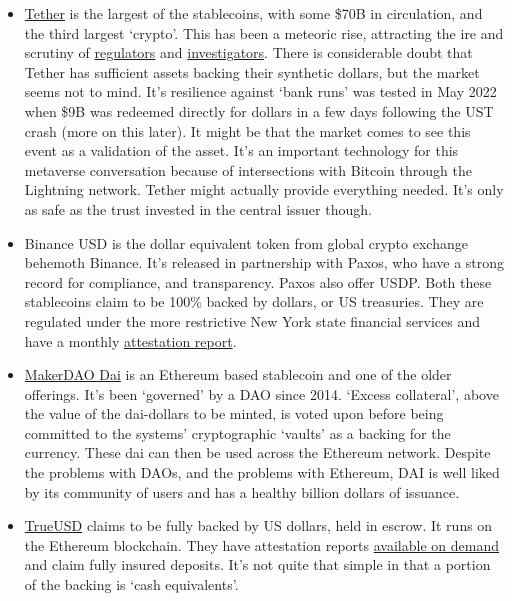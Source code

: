 \begin{itemize}
\item \href{https://tether.to/en/whitepaper/}{Tether} is the largest of the stablecoins, with some \$70B in circulation, and the third largest `crypto'. This has been a meteoric rise, attracting the ire and scrutiny of \href{https://www.cftc.gov/PressRoom/PressReleases/8450-21}{regulators} and \href{https://www.bloomberg.com/news/features/2021-10-07/crypto-mystery-where-s-the-69-billion-backing-the-stablecoin-tether}{investigators}. There is considerable doubt that Tether has sufficient assets backing their synthetic dollars, but the market seems not to mind. It's resilience against `bank runs' was tested in May 2022 when \$9B was redeemed directly for dollars in a few days following the UST crash (more on this later). It might be that the market comes to see this event as a validation of the asset. It's an important technology for this metaverse conversation because of intersections with Bitcoin through the Lightning network. Tether might actually provide everything needed. It's only as safe as the trust invested in the central issuer though.
\item Binance USD is the dollar equivalent token from global crypto exchange behemoth Binance. It's released in partnership with Paxos, who have a strong record for compliance, and transparency. Paxos also offer USDP. Both these stablecoins claim to be 100\% backed by dollars, or US treasuries. They are regulated under the more restrictive New York state financial services and have a monthly \href{https://paxos.com/attestations/}{attestation report}.
\item \href{https://makerdao.com/en/whitepaper#abstract}{MakerDAO Dai} is an Ethereum based stablecoin and one of the older offerings. It's been `governed' by a DAO since 2014. `Excess collateral', above the value of the dai-dollars to be minted, is voted upon before being committed to the systems' cryptographic `vaults' as a backing for the currency. These dai can then be used across the Ethereum network. Despite the problems with DAOs, and the problems with Ethereum, DAI is well liked by its community of users and has a healthy billion dollars of issuance.
\item \href{https://trueusd.com/pdf/TUSD_WhitePaper.pdf}{TrueUSD} claims to be fully backed by US dollars, held in escrow. It runs on the Ethereum blockchain. They have attestation reports \href{https://real-time-attest.trustexplorer.io/truecurrencies}{available on demand} and claim fully insured deposits. It's not quite that simple in that a portion of the backing is `cash equivalents'.

\end{itemize}
